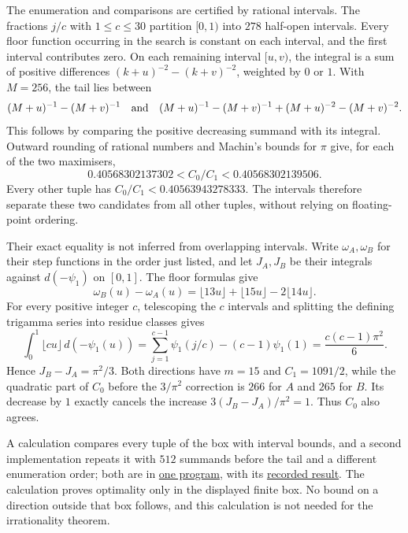 \documentclass[11pt]{article}
\begin{document}
The enumeration and comparisons are certified by rational intervals.
The fractions $j/c$ with $1\le c\le30$ partition $[0,1)$ into $278$
half-open intervals. Every floor function occurring in the search is
constant on each interval, and the first interval contributes zero. On each remaining interval $[u,v)$,
the integral is a sum of positive differences
$(k+u)^{-2}-(k+v)^{-2}$, weighted by $0$ or $1$. With $M=256$, the tail
lies between
\[
 (M+u)^{-1}-(M+v)^{-1}
 \quad\hbox{and}\quad
 (M+u)^{-1}-(M+v)^{-1}+(M+u)^{-2}-(M+v)^{-2}.
\]
This follows by comparing the positive decreasing summand with its
integral. Outward rounding of rational numbers and Machin's bounds for
$\pi$ give, for each of the two maximisers,
\[
 0.40568302137302<C_0/C_1<0.40568302139506.
\]
Every other tuple has $C_0/C_1<0.40563943278333$. The intervals therefore
separate these two candidates from all other tuples, without relying
on floating-point ordering.

Their exact equality is not inferred from overlapping intervals.
Write $\omega_A,\omega_B$ for their step functions in the order just
listed, and let $J_A,J_B$ be their integrals against $d(-\psi_1)$
on $[0,1]$. The floor formulas give
\[
 \omega_B(u)-\omega_A(u)
 =\lfloor13u\rfloor+\lfloor15u\rfloor-2\lfloor14u\rfloor.
\]
For every positive integer $c$, telescoping the $c$ intervals and
splitting the defining trigamma series into residue classes gives
\[
 \int_0^1\lfloor cu\rfloor\,d(-\psi_1(u))
 =\sum_{j=1}^{c-1}\psi_1(j/c)-(c-1)\psi_1(1)
 =\frac{c(c-1)\pi^2}{6}.
\]
Hence $J_B-J_A=\pi^2/3$. Both directions have $m=15$ and
$C_1=1091/2$, while the quadratic part of $C_0$ before the $3/\pi^2$ correction is
$266$ for $A$ and $265$ for $B$. Its decrease by $1$ exactly cancels
the increase $3(J_B-J_A)/\pi^2=1$. Thus $C_0$ also agrees.

A calculation compares every tuple of the box with interval bounds,
and a second implementation repeats it with $512$ summands before the
tail and a different enumeration order; both are in
\href{https://github.com/wcook04/plectis-erdos/blob/4beca4ad0c00a626def9c73f2420e20ebf8d1968/research/experiments/erdos1049/parameter_box.py}{one program}, with its \href{https://github.com/wcook04/plectis-erdos/blob/4beca4ad0c00a626def9c73f2420e20ebf8d1968/research/experiments/erdos1049/receipts/parameter-box.json}{recorded result}.
The calculation proves optimality only in the displayed finite box. No
bound on a direction outside that box follows, and this calculation
is not needed for the irrationality theorem.
\end{document}
